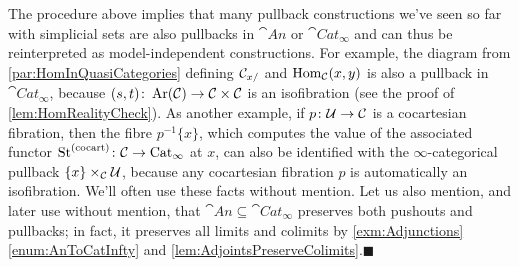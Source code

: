 \begin{numpar}
	The procedure above implies that many pullback constructions we've seen so far with simplicial sets are also pullbacks in $\cat{An}$ or $\cat{Cat}_\infty$ and can thus be reinterpreted as model-independent constructions. For example, the diagram from \cref{par:HomInQuasiCategories} defining $\mathcal{C}_{x/}$ and $\operatorname{Hom}_{\mathcal{C}}(x,y)$ is also a pullback in $\cat{Cat}_\infty$, because $(s,t)\colon \operatorname{Ar}(\mathcal{C})\rightarrow \mathcal{C}\times\mathcal{C}$ is an isofibration (see the proof of \cref{lem:HomRealityCheck}). As another example, if $p\colon\mathcal{U}\rightarrow \mathcal{C}$ is a cocartesian fibration, then the fibre $p^{-1}\{x\}$, which computes the value of the associated functor $\operatorname{St}^{(\mathrm{cocart})}\colon \mathcal{C}\rightarrow\mathrm{Cat}_\infty$ at $x$, can also be identified with the $\infty$-categorical pullback $\{x\}\times_{\mathcal{C}}\mathcal{U}$, because any cocartesian fibration $p$ is automatically an isofibration. We'll often use these facts without mention. Let us also mention, and later use without mention, that $\cat{An}\subseteq\cat{Cat}_\infty$ preserves both pushouts and pullbacks; in fact, it preserves all limits and colimits by \cref{exm:Adjunctions}\cref{enum:AnToCatInfty} and \cref{lem:AdjointsPreserveColimits}.\hfill$\blacksquare$
\end{numpar}
